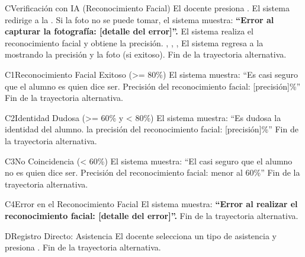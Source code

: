\begin{UCtrayectoriaA}{C}{Verificación con IA (Reconocimiento Facial)}
	\UCpaso[\UCactor] El docente presiona .
	\UCpaso El sistema redirige a la .
	\UCpaso Si la foto no se puede tomar, el sistema muestra: \textbf{ ``Error al capturar la fotografía: [detalle del error]''.}
	\UCpaso El sistema realiza el reconocimiento facial y obtiene la precisión. , , , 
	\UCpaso El sistema regresa a la  mostrando la precisión y la foto (si exitoso).
	\UCpaso Fin de la trayectoria alternativa.
\end{UCtrayectoriaA}
\begin{UCtrayectoriaA}{C1}{Reconocimiento Facial Exitoso (>= 80\%)}
	\UCpaso El sistema muestra: ``Es casi seguro que el alumno es quien dice ser. Precisión del reconocimiento facial: [precisión]\%''
	\UCpaso Fin de la trayectoria alternativa.
\end{UCtrayectoriaA}
\begin{UCtrayectoriaA}{C2}{Identidad Dudosa (>= 60\% y < 80\%)}
	\UCpaso El sistema muestra: ``Es dudosa la identidad del alumno. la precisión del reconocimiento facial: [precisión]\%''
	\UCpaso Fin de la trayectoria alternativa.
\end{UCtrayectoriaA}
\begin{UCtrayectoriaA}{C3}{No Coincidencia (< 60\%)}
	\UCpaso El sistema muestra: ``El casi seguro que el alumno no es quien dice ser. Precisión del reconocimiento facial: menor al 60\%''
	\UCpaso Fin de la trayectoria alternativa.
\end{UCtrayectoriaA}
\begin{UCtrayectoriaA}{C4}{Error en el Reconocimiento Facial}
	\UCpaso El sistema muestra: \textbf{ ``Error al realizar el reconocimiento facial: [detalle del error]''.}
	\UCpaso Fin de la trayectoria alternativa.
\end{UCtrayectoriaA}

\begin{UCtrayectoriaA}{D}{Registro Directo: Asistencia}
	\UCpaso[\UCactor] El docente selecciona un tipo de asistencia y presiona . 
	\UCpaso Fin de la trayectoria alternativa.
\end{UCtrayectoriaA}

